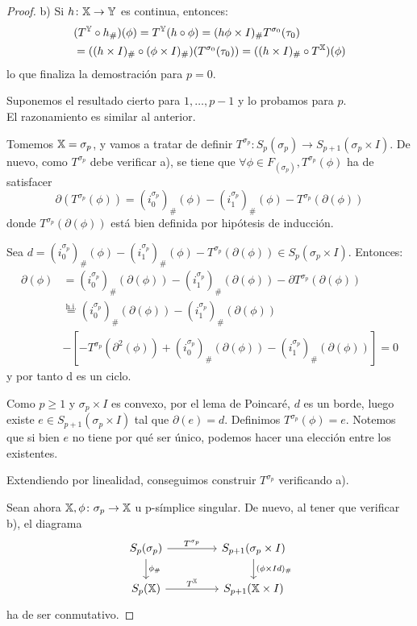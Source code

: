 \begin{proof}
  b) Si $h \colon {\mathbb X} \to {\mathbb Y}$ es continua, entonces:
  \begin{align*}
    &(T^{\mathbb Y} \circ h_\#)(\phi) = T^{\mathbb Y}(h \circ \phi) = (h\phi \times I)_\# T^{\sigma_0}(\tau_0) \\
    &= ((h \times I)_\# \circ (\phi \times I)_\#) (T^{\sigma_0}(\tau_0)) = ((h \times I)_\# \circ T^{\mathbb X})(\phi)
  \end{align*}
  lo que finaliza la demostración para $p = 0$.

  Suponemos el resultado cierto para $1, \dots, p-1$ y lo probamos para $p$. \\
  El razonamiento es similar al anterior.

  Tomemos ${\mathbb X} = \sigma_p$, y vamos a tratar de definir $T^{\sigma_p} \colon S_p(\sigma_p) \to S_{p+1}(\sigma_p \times I)$.
  De nuevo, como $T^{\sigma_p}$ debe verificar a), se tiene que $\forall \phi \in F_(\sigma_p), T^{\sigma_p}(\phi)$ ha de satisfacer
  \[ \partial(T^{\sigma_p}(\phi)) = (i_0^{\sigma_p})_\# (\phi) - (i_1^{\sigma_p})_\# (\phi) - T^{\sigma_p}(\partial(\phi)) \]
  donde $T^{\sigma_p}(\partial(\phi))$ está bien definida por hipótesis de inducción.

  Sea $d = (i_0^{\sigma_p})_\# (\phi) - (i_1^{\sigma_p})_\# (\phi) - T^{\sigma_p}(\partial(\phi)) \in S_p(\sigma_p \times I)$.
  Entonces:
  \begin{align*}
    \partial(\phi) &= (i_0^{\sigma_p})_\# (\partial(\phi)) - (i_1^{\sigma_p})_\# (\partial(\phi)) - \partial T^{\sigma_p}(\partial(\phi)) \\
                   &\stackrel{\text{h.i.}}{=} (i_0^{\sigma_p})_\#(\partial(\phi)) - (i_1^{\sigma_p})_\#(\partial(\phi)) \\
                   &- [ - T^{\sigma_p}(\partial^2(\phi)) + (i_0^{\sigma_p})_\#(\partial(\phi)) - (i_1^{\sigma_p})_\#(\partial(\phi)) ] = 0
  \end{align*}
  y por tanto d es un ciclo.

  Como $p \geq 1$ y $\sigma_p \times I$ es convexo, por el lema de Poincaré, $d$ es un borde, luego existe $e \in S_{p+1}(\sigma_p \times I)$
  tal que $\partial(e) = d$. Definimos $T^{\sigma_p}(\phi) = e$. Notemos que si bien $e$ no tiene por qué ser único, podemos hacer una elección
  entre los existentes.

  Extendiendo por linealidad, conseguimos construir $T^{\sigma_p}$ verificando a).

  Sean ahora ${\mathbb X}, \phi \colon \sigma_p \to {\mathbb X}$ u p-símplice singular. De nuevo, al tener que verificar b), el diagrama
  \[
  \begin{tikzcd}
    S_p(\sigma_p) \arrow{r}{T^{\sigma_p}} \arrow{d}{\phi_\#} & [2em] S_{p+1}(\sigma_p \times I) \arrow{d}{(\phi \times Id)_\#} \\
    \SX{p} \arrow{r}{T^\X}                 & S_{p+1}(\X \times I)
  \end{tikzcd}
  \]
  ha de ser conmutativo.


\end{proof}
